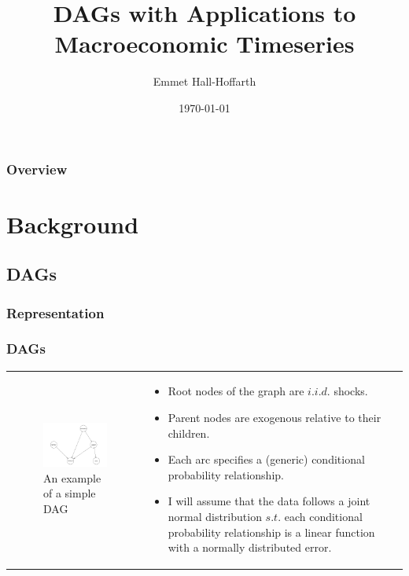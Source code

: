 \documentclass{beamer}
\title[Macro DAGs]{DAGs with Applications to Macroeconomic Timeseries} %
\author{Emmet Hall-Hoffarth} %
\institute[Oxford] %
{
University of Oxford \\ %
\medskip
\textit{emmet.hall-hoffarth@economics.ox.ac.uk} %
}
\date{\today} %
\begin{document}
\begin{frame}
    \titlepage %
\end{frame}

\begin{frame}
    \frametitle{Overview} %
    \tableofcontents %
\end{frame}

\section{Background}

\subsection{DAGs}
\subsubsection{Representation}
\begin{frame}
    \frametitle{DAGs}
    \begin{tabular}{ p{5.5cm} p{5.5cm} }
        \begin{figure}
            \includegraphics[width=4.5cm]{images/trafficjam.png}
            \caption{An example of a simple DAG}
            \label{dag1}
        \end{figure}
        &
        \begin{itemize}
            \item Root nodes of the graph are $i.i.d.$ shocks.
            \item Parent nodes are exogenous relative to their children.
            \item Each arc specifies a (generic) conditional probability relationship.
            \item I will assume that the data follows a joint normal distribution $s.t.$ each conditional probability relationship is a linear function with a normally distributed error.
        \end{itemize}
    \end{tabular}
\end{frame}
\end{document}
